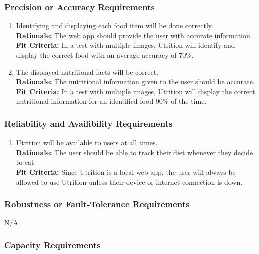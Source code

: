 \documentclass[12pt]{article}
\begin{document}
\subsubsection{Precision or Accuracy Requirements}

\begin{enumerate}[start=14,label={PR\arabic*.}]
	\item Identifying and displaying each food item will be done correctly. \\
	\textbf{Rationale:} The web app should provide the user with accurate information. \\
	\textbf{Fit Criteria:} In a test with multiple images, Utrition will identify and display the correct food with an average accuracy of 70\%.
	\item  The displayed nutritional facts will be correct. \\
	\textbf{Rationale:} The nutritional information given to the user should be accurate. \\
	\textbf{Fit Criteria:} In a test with multiple images, Utrition will display the correct nutritional information for an identified food 90\% of the time.
\end{enumerate}

\subsubsection{Reliability and Availibility Requirements}

\begin{enumerate}[{PR}16. ] 
	\item Utrition will be available to users at all times.\\
	\textbf{Rationale:} The user should be able to track their diet whenever they decide to eat. \\
	\textbf{Fit Criteria:} Since Utrition is a local web app, the user will always be allowed to use Utrition unless their device or internet connection is down.
\end{enumerate}

\subsubsection{Robustness or Fault-Tolerance Requirements}
\hspace{1.5cm}N/A

\subsubsection{Capacity Requirements}
\end{document}
